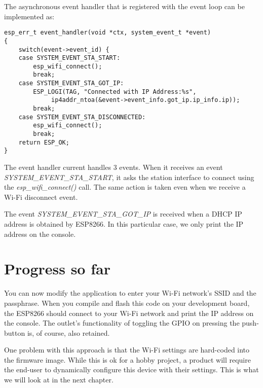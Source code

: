 \documentclass[main.tex]{subfiles}
\begin{document}

The asynchronous event handler that is registered with the event loop can be implemented as:
\begin{verbatim}
esp_err_t event_handler(void *ctx, system_event_t *event)
{
    switch(event->event_id) {
    case SYSTEM_EVENT_STA_START:
        esp_wifi_connect();
        break;
    case SYSTEM_EVENT_STA_GOT_IP:
        ESP_LOGI(TAG, "Connected with IP Address:%s",  
             ip4addr_ntoa(&event->event_info.got_ip.ip_info.ip));
        break;
    case SYSTEM_EVENT_STA_DISCONNECTED:
        esp_wifi_connect();
        break;
    return ESP_OK;
}
\end{verbatim}

The event handler current handles 3 events. When it receives an event \textit{SYSTEM\_EVENT\_STA\_START}, it asks the station interface to connect using the \textit{esp\_wifi\_connect()} call. The same action is taken even when we receive a Wi-Fi disconnect event.

The event \textit{SYSTEM\_EVENT\_STA\_GOT\_IP} is received when a DHCP IP address is obtained by ESP8266. In this particular case, we  only print the IP address on the console.

\section{Progress so far}
You can now modify the application to enter your Wi-Fi network's SSID and the passphrase. When you compile and flash this code on your development board, the ESP8266 should connect to your Wi-Fi network and print the IP address on the console. The outlet's functionality of toggling the GPIO on pressing the push-button is, of course, also retained.

One problem with this approach is that the Wi-Fi settings are hard-coded into the firmware image. While this is ok for a hobby project, a product will require the end-user to dynamically configure this device with their settings. This is what we will look at in the next chapter.
\end{document}
